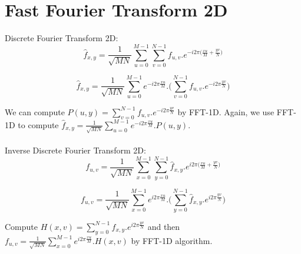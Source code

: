 \documentclass{article}
\begin{document}
\section{Fast Fourier Transform 2D}
Discrete Fourier Transform 2D:
$$\hat{f}_{x, y} = \frac{1}{\sqrt{MN}} \sum\limits_{u = 0}^{M - 1} \sum\limits_{v = 0}^{N - 1} f_{u, v}.e^{-i2\pi \big( \frac{xu}{M} + \frac{yv}{N} \big)}$$

$$\hat{f}_{x, y} = \frac{1}{\sqrt{MN}} \sum\limits_{u = 0}^{M - 1} e^{-i2\pi \frac{xu}{M}} .\bigg( \sum\limits_{v = 0}^{N - 1} f_{u, v}.e^{-i2\pi \frac{yv}{N}} \bigg)$$

We can compute $P(u, y) = \sum\limits_{v = 0}^{N - 1} f_{u, v}.e^{-i2\pi \frac{yv}{N}}$ by FFT-1D. Again, we use FFT-1D to compute $\hat{f}_{x, y} = \frac{1}{\sqrt{MN}} \sum\limits_{u = 0}^{M - 1} e^{-i2\pi \frac{xu}{M}}.P(u, y)$.\\ \\
Inverse Discrete Fourier Transform 2D:
$$f_{u, v} = \frac{1}{\sqrt{MN}} \sum\limits_{x = 0}^{M - 1} \sum\limits_{y = 0}^{N - 1} \hat{f}_{x, y}.e^{i2\pi \big( \frac{xu}{M} + \frac{yv}{N} \big)}$$

$$f_{u, v} = \frac{1}{\sqrt{MN}} \sum\limits_{x = 0}^{M - 1} e^{i2\pi \frac{xu}{M}} . \bigg( \sum\limits_{y = 0}^{N - 1} \hat{f}_{x, y} . e^{i2\pi \frac{yv}{N}}\bigg)$$

Compute $H(x, v) = \sum\limits_{y = 0}^{N - 1} \hat{f}_{x, y}.e^{i2\pi \frac{yv}{N}}$ and then $f_{u, v} = \frac{1}{\sqrt{MN}} \sum\limits_{x = 0}^{M - 1} e^{i2\pi \frac{xu}{M}}.H(x, v)$ by FFT-1D algorithm.
\end{document}
